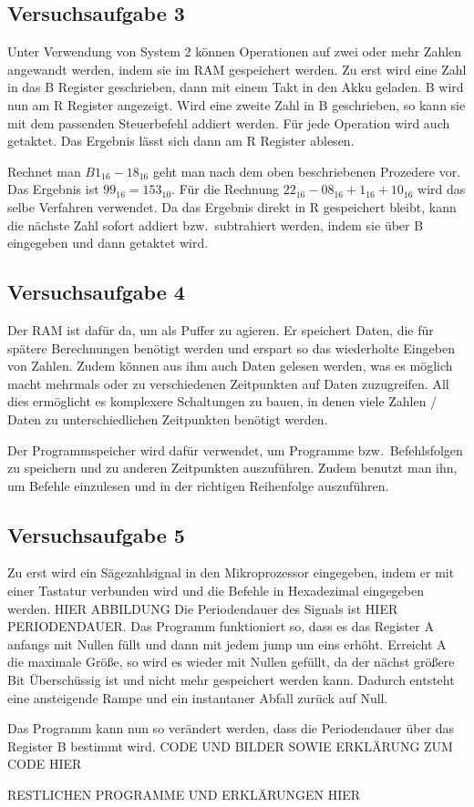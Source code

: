 \documentclass[10pt]{article}
\begin{document}
\begin{multicols}{2}
        \subsection{Versuchsaufgabe 3}
        Unter Verwendung von System 2 können Operationen auf zwei oder mehr Zahlen angewandt werden, indem sie im RAM gespeichert werden.
        Zu erst wird eine Zahl in das B Register geschrieben, dann mit einem Takt in den Akku geladen.
        B wird nun am R Register angezeigt.
        Wird eine zweite Zahl in B geschrieben, so kann sie mit dem passenden Steuerbefehl addiert werden.
        Für jede Operation wird auch getaktet.
        Das Ergebnis lässt sich dann am R Register ablesen.
        \par Rechnet man $B1_{16}-18_{16}$ geht man nach dem oben beschriebenen Prozedere vor.
        Das Ergebnis ist $99_{16}=153_{10}$.
        Für die Rechnung $22_{16}-08_{16}+1_{16}+10_{16}$ wird das selbe Verfahren verwendet.
        Da das Ergebnis direkt in R gespeichert bleibt, kann die nächste Zahl sofort addiert bzw.\ subtrahiert werden, indem sie über B eingegeben und dann getaktet wird.

        \subsection{Versuchsaufgabe 4}
        Der RAM ist dafür da, um als Puffer zu agieren.
        Er speichert Daten, die für spätere Berechnungen benötigt werden und erspart so das wiederholte Eingeben von Zahlen.
        Zudem können aus ihm auch Daten gelesen werden, was es möglich macht mehrmals oder zu verschiedenen Zeitpunkten auf Daten zuzugreifen.
        All dies ermöglicht es komplexere Schaltungen zu bauen, in denen viele Zahlen / Daten zu unterschiedlichen Zeitpunkten benötigt werden.
        \par Der Programmspeicher wird dafür verwendet, um Programme bzw.\ Befehlsfolgen zu speichern und zu anderen Zeitpunkten auszuführen.
        Zudem benutzt man ihn, um Befehle einzulesen und in der richtigen Reihenfolge auszuführen.

        \subsection{Versuchsaufgabe 5}
        Zu erst wird ein Sägezahlsignal in den Mikroprozessor eingegeben, indem er mit einer Tastatur verbunden wird und die Befehle in Hexadezimal eingegeben werden.
        HIER ABBILDUNG
        Die Periodendauer des Signals ist HIER PERIODENDAUER.
        Das Programm funktioniert so, dass es das Register A anfangs mit Nullen füllt und dann mit jedem jump um eins erhöht.
        Erreicht A die maximale Größe, so wird es wieder mit Nullen gefüllt, da der nächst größere Bit Überschüssig ist und nicht mehr gespeichert werden kann.
        Dadurch entsteht eine ansteigende Rampe und ein instantaner Abfall zurück auf Null.
        \par Das Programm kann nun so verändert werden, dass die Periodendauer über das Register B bestimmt wird. CODE UND BILDER SOWIE ERKLÄRUNG ZUM CODE HIER
        \par RESTLICHEN PROGRAMME UND ERKLÄRUNGEN HIER


\end{multicols}
\end{document}
